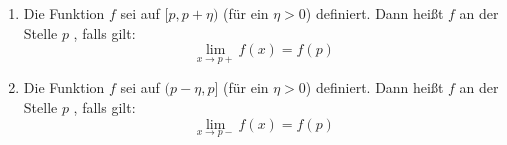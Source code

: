 \begin{enumerate}[leftmargin=*]
    \item Die Funktion $f$ sei auf $[p, p + \eta)$ (für ein $\eta > 0$) definiert. Dann heißt $f$ an der Stelle $p$ , falls gilt:
    $$\lim_{x \to p+} f(x) = f(p)$$
    \item Die Funktion $f$ sei auf $(p - \eta, p]$ (für ein $\eta > 0$) definiert. Dann heißt $f$ an der Stelle $p$ , falls gilt:
    $$\lim_{x \to p-} f(x) = f(p)$$
\end{enumerate}
